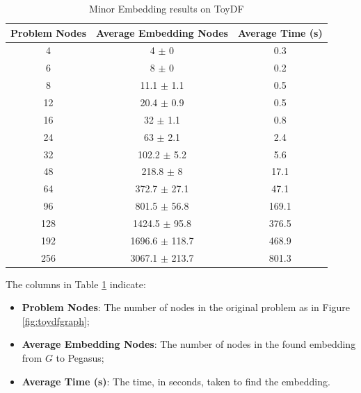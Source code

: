 \begin{table}[H]
    \centering
    \begin{tabular}{ccc}
        \toprule
        Problem Nodes & Average Embedding Nodes & Average Time (s) \\
        \midrule
        \rowcolor{lightgray} 4 & 4 $\pm$ 0 & 0.3 \\
        6 & 8 $\pm$ 0 & 0.2 \\ 
        \rowcolor{lightgray} 8 & 11.1 $\pm$ 1.1 & 0.5 \\ 
        12 & 20.4 $\pm$ 0.9 & 0.5 \\ 
        \rowcolor{lightgray} 16 & 32 $\pm$ 1.1 & 0.8 \\ 
        24 & 63 $\pm$ 2.1 & 2.4 \\ 
        \rowcolor{lightgray} 32 & 102.2 $\pm$ 5.2 & 5.6 \\ 
        48 & 218.8 $\pm$ 8 & 17.1 \\ 
        \rowcolor{lightgray} 64 & 372.7 $\pm$ 27.1 & 47.1 \\ 
        96 & 801.5 $\pm$ 56.8 & 169.1 \\ 
        \rowcolor{lightgray} 128 & 1424.5 $\pm$ 95.8 & 376.5 \\ 
        192 & 1696.6 $\pm$ 118.7 & 468.9 \\ 
        \rowcolor{lightgray} 256 & 3067.1 $\pm$ 213.7 & 801.3 \\
        \bottomrule
    \end{tabular}
    \caption{Minor Embedding results on ToyDF}
    \label{tab:scale}
\end{table}

The columns in Table \ref{tab:scale} indicate: 
\begin{itemize} 
	\item \textbf{Problem Nodes}: The number of nodes in the original problem as in Figure \ref{fig:toydfgraph}; 
	\item \textbf{Average Embedding Nodes}: The number of nodes in the found embedding from $G$ to Pegasus; 
	\item \textbf{Average Time (s)}: The time, in seconds, taken to find the embedding. 
\end{itemize}

